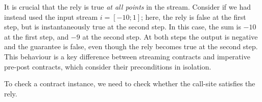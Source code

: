 It is crucial that the rely is true \emph{at all points} in the stream.
Consider if we had instead used the input stream $i = [-10; 1]$; here, the rely is false at the first step, but is instantaneously true at the second step.
In this case, the sum is $-10$ at the first step, and $-9$ at the second step.
At both steps the output is negative and the guarantee is false, even though the rely becomes true at the second step.
This behaviour is a key difference between streaming contracts and imperative pre-post contracts, which consider their preconditions in isolation.

To check a contract instance, we need to check whether the call-site satisfies the rely.




